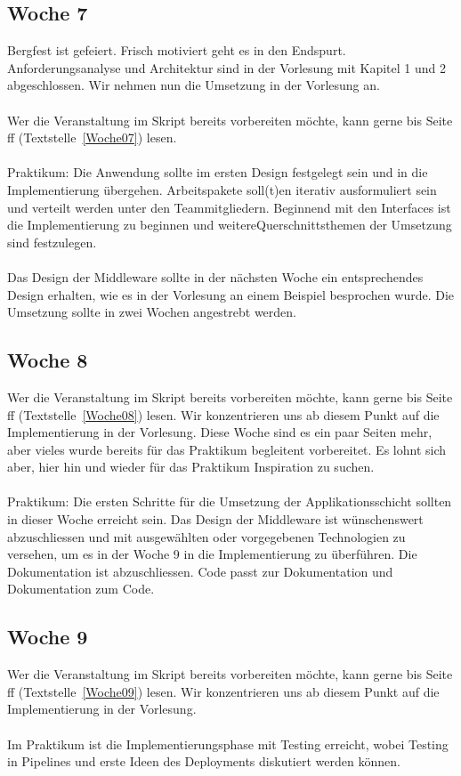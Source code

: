 \subsection{Woche 7}
Bergfest ist gefeiert.  Frisch motiviert geht es in den Endspurt.  Anforderungsanalyse und Architektur sind in der Vorlesung mit Kapitel 1 und 2 abgeschlossen. Wir nehmen nun die Umsetzung in der Vorlesung an. 
\\\\
Wer die Veranstaltung im Skript bereits vorbereiten möchte, kann gerne bis Seite \pageref{Woche07}ff (Textstelle~\ref{Woche07})  lesen. 
\\\\
Praktikum: Die Anwendung sollte im ersten Design festgelegt sein und in die Implementierung übergehen. Arbeitspakete soll(t)en iterativ ausformuliert sein und verteilt werden unter den Teammitgliedern. Beginnend mit den Interfaces ist die Implementierung zu beginnen und weitereQuerschnittsthemen der  Umsetzung sind festzulegen. 
\\\\
Das Design der Middleware sollte in der nächsten Woche ein entsprechendes Design erhalten, wie es in der Vorlesung an einem Beispiel besprochen wurde. Die Umsetzung sollte in zwei Wochen angestrebt werden. 

\subsection{Woche 8}
Wer die Veranstaltung im Skript bereits vorbereiten möchte, kann gerne bis Seite \pageref{Woche08}ff (Textstelle~\ref{Woche08})  lesen. Wir konzentrieren uns ab diesem Punkt auf die Implementierung in der Vorlesung. Diese Woche sind es ein paar Seiten mehr, aber vieles wurde bereits für das Praktikum begleitent vorbereitet. Es lohnt sich aber, hier hin und wieder für das Praktikum Inspiration zu suchen. 
\\\\
Praktikum:  Die ersten Schritte für die Umsetzung der Applikationsschicht sollten in dieser Woche erreicht sein. Das Design der Middleware ist wünschenswert abzuschliessen und mit ausgewählten oder vorgegebenen Technologien zu versehen, um es in der Woche 9 in die Implementierung zu überführen. Die Dokumentation ist abzuschliessen. Code passt zur Dokumentation und Dokumentation zum Code.

\subsection{Woche 9}
Wer die Veranstaltung im Skript bereits vorbereiten möchte, kann gerne bis Seite \pageref{Woche09}ff (Textstelle~\ref{Woche09}) lesen. Wir konzentrieren uns ab diesem Punkt auf die Implementierung in der Vorlesung.
\\\\
Im Praktikum ist die Implementierungsphase mit Testing erreicht, wobei Testing in Pipelines und erste Ideen des Deployments diskutiert werden können.
